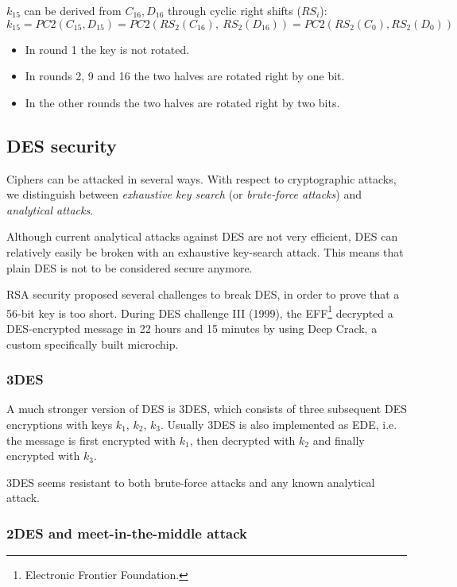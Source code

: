 \documentclass{article}
\begin{document}
  $k_{15}$ can be derived from $C_{16}, D_{16}$ through cyclic right
  shifts ($RS_{i}$):
  $$
	k_{15} = PC2(C_{15}, D_{15}) = PC2(RS_{2}(C_{16}),~
	RS_{2}(D_{16})) =
	PC2(RS_{2}(C_{0}), RS_{2}(D_{0}))
  $$

  \begin{itemize}
	\item In round 1 the key is not rotated.
	\item In rounds 2, 9 and 16 the two halves are rotated right by
	  one bit.
	\item In the other rounds the two halves are rotated right by two
	  bits.
  \end{itemize}
  
  \subsection{DES security}

  Ciphers can be attacked in several ways. With respect to
  cryptographic attacks, we distinguish between \emph{exhaustive key
  search} (or \emph{brute-force attacks}) and \emph{analytical
  attacks}.

  Although current analytical attacks against DES are not very
  efficient, DES can relatively easily be broken with an exhaustive
  key-search attack.
  This means that plain DES is not to be considered secure anymore.

  RSA security proposed several challenges to break DES, in order to
  prove that a 56-bit key is too short. During DES challenge III (1999),
  the EFF\footnote{Electronic Frontier Foundation.} decrypted a
  DES-encrypted message in 22 hours and 15 minutes by using Deep Crack, a 
  custom specifically built microchip.

  \subsubsection{3DES}

  A much stronger version of DES is 3DES, which consists of three
  subsequent DES encryptions with keys $k_{1}$, $k_{2}$, $k_{3}$.
  Usually 3DES is also implemented as EDE, i.e. the message is first
  encrypted with $k_{1}$, then decrypted with $k_{2}$ and finally
  encrypted with $k_{3}$.

  3DES seems resistant to both brute-force attacks and any known
  analytical attack.

  \subsubsection{2DES and meet-in-the-middle attack}
  
\end{document}
